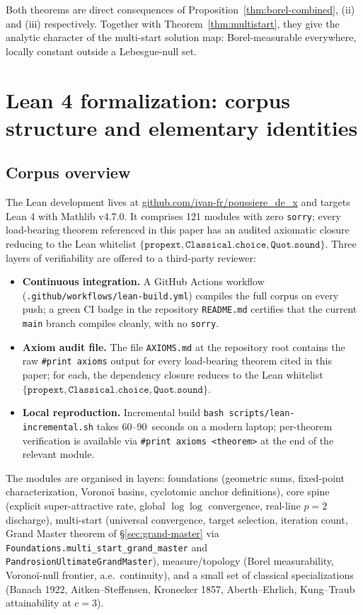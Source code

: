 \documentclass[11pt,a4paper]{article}
\theoremstyle{definition}
\begin{document}
Both theorems are direct consequences of Proposition~\ref{thm:borel-combined}, (ii) and (iii) respectively. Together with Theorem~\ref{thm:multistart}, they give the analytic character of the multi-start solution map: Borel-measurable everywhere, locally constant outside a Lebesgue-null set.

\section{Lean 4 formalization: corpus structure and elementary identities}
\label{sec:lean-corpus}

\subsection{Corpus overview}

The Lean development lives at
\url{github.com/ivan-fr/poussiere_de_x} and targets Lean 4 with Mathlib v4.7.0. It comprises 121 modules with zero \texttt{sorry}; every load-bearing theorem referenced in this paper has an audited axiomatic closure reducing to the Lean whitelist $\{\texttt{propext}, \texttt{Classical.choice}, \texttt{Quot.sound}\}$. Three layers of verifiability are offered to a third-party reviewer:
\begin{itemize}
  \item \textbf{Continuous integration.} A GitHub Actions workflow (\texttt{.github/workflows/lean-build.yml}) compiles the full corpus on every push; a green CI badge in the repository \texttt{README.md} certifies that the current \texttt{main} branch compiles cleanly, with no \texttt{sorry}.
  \item \textbf{Axiom audit file.} The file \texttt{AXIOMS.md} at the repository root contains the raw \texttt{\#print axioms} output for every load-bearing theorem cited in this paper; for each, the dependency closure reduces to the Lean whitelist $\{\texttt{propext}, \texttt{Classical.choice}, \texttt{Quot.sound}\}$.
  \item \textbf{Local reproduction.} Incremental build \texttt{bash scripts/lean-incremental.sh} takes 60--90~seconds on a modern laptop; per-theorem verification is available via \texttt{\#print axioms <theorem>} at the end of the relevant module.
\end{itemize}
The modules are organised in layers: foundations (geometric sums, fixed-point characterization, Voronoï basins, cyclotomic anchor definitions), core spine (explicit super-attractive rate, global $\log\log$ convergence, real-line $p = 2$ discharge), multi-start (universal convergence, target selection, iteration count, Grand Master theorem of \S\ref{sec:grand-master} via \texttt{Foundations.multi\_start\_grand\_master} and \texttt{PandrosionUltimateGrandMaster}), measure/topology (Borel measurability, Voronoï-null frontier, a.e.\ continuity), and a small set of classical specializations (Banach 1922, Aitken--Steffensen, Kronecker 1857, Aberth--Ehrlich, Kung--Traub attainability at $c=3$).
\end{document}

